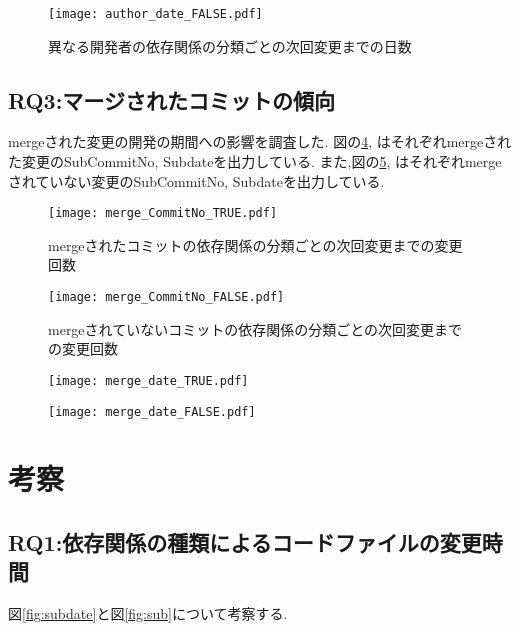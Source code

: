 \documentclass[submit,ses,noauthor]{ipsj} %
\begin{document}
\begin{figure}
\centering
\texttt{[image: author\_date\_FALSE.pdf]}
\caption{異なる開発者の依存関係の分類ごとの次回変更までの日数}
\label{fig:author_false_subdate} 
\end{figure}


\subsection{RQ3:マージされたコミットの傾向}
mergeされた変更の開発の期間への影響を調査した.
図の\ref{fig:merge_true_subNo},\label{fig:merge_true_subdate} はそれぞれmergeされた変更のSubCommitNo, Subdateを出力している.
また,図の\ref{fig:merge_false_subNo},\label{fig:merge_false_subdate} はそれぞれmergeされていない変更のSubCommitNo, Subdateを出力している.


\begin{figure}
\centering
\texttt{[image: merge\_CommitNo\_TRUE.pdf]}
\caption{mergeされたコミットの依存関係の分類ごとの次回変更までの変更回数}
\label{fig:merge_true_subNo} 
\end{figure}

\begin{figure}
\centering
\texttt{[image: merge\_CommitNo\_FALSE.pdf]}
\caption{mergeされていないコミットの依存関係の分類ごとの次回変更までの変更回数}
\label{fig:merge_false_subNo} 
\end{figure}



\begin{figure}
\centering
\texttt{[image: merge\_date\_TRUE.pdf]}
\caption{}
\label{fig:merge_true_subNo} 
\end{figure}

\begin{figure}
\centering
\texttt{[image: merge\_date\_FALSE.pdf]}
\caption{}
\label{fig:merge_false_subNo} 
\end{figure}


\section{考察}\label{考察}

\subsection{RQ1:依存関係の種類によるコードファイルの変更時間}
図\ref{fig:subdate}と図\ref{fig:sub}について考察する.
\end{document}
